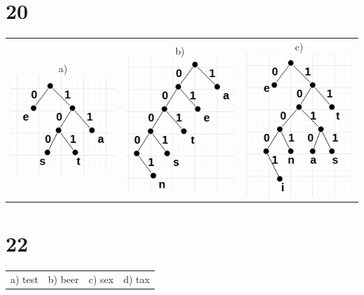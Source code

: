 \documentclass[12pt]{article}
\begin{document}
    \section*{20}
      \begin{center}
        \begin{tabular}{ccc}
          a)
          \includegraphics{20_a.png} 
          & 
          b)
          \includegraphics{20_b.png} 
          & 
          c)
          \includegraphics{20_c.png} 
        \end{tabular}
      \end{center}
    \section*{22}
      \begin{tabular}{cccc}
        a) test & b) beer & c) sex & d) tax
      \end{tabular}
\end{document}
